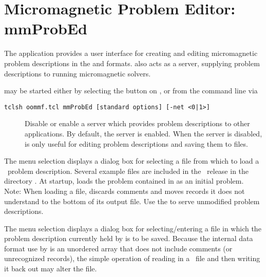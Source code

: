 \section{Micromagnetic Problem Editor: mmProbEd}\label{sec:mmprobed}

\begin{center}
\end{center}

The application  provides a
user interface for creating and editing micromagnetic problem
descriptions in the  and
 formats.  
also acts as a server, supplying problem descriptions to running
 micromagnetic solvers.

 may be started either by selecting the
 button on , or from the
command line via
\begin{verbatim}
tclsh oommf.tcl mmProbEd [standard options] [-net <0|1>]
\end{verbatim}

\begin{description}
\item[]
  Disable or enable a server which provides problem descriptions
  to other applications.  By default, the server is enabled.  When
  the server is disabled,  is only useful for editing
  problem descriptions and saving them to files.
\end{description}

The menu selection  displays a dialog box
for selecting a file from which to load a \MIF\ problem 
description.  Several example files are included in the 
\OOMMF\ release in the directory .
At startup,  loads the problem contained in
 as an initial problem.  Note: When loading
a file,  discards comments and moves records it does not
understand to the bottom of its output file.  Use the
 to serve unmodified problem descriptions.

The menu selection  displays a dialog box for
selecting/entering a file in which the problem description currently
held by  is to be saved.  Because the internal data format
use by  is an unordered array that does not include
comments (or unrecognized records), the simple operation of reading in a
\MIF\ file and then writing it back out may alter the file.

